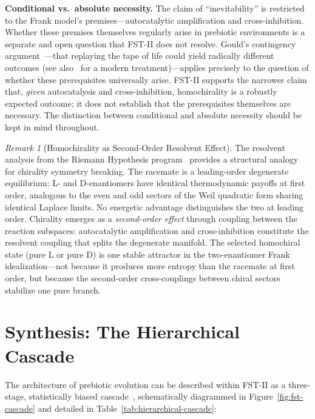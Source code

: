 \documentclass[12pt,a4paper]{article}
\theoremstyle{remark}
\newtheorem{remark}{Remark}
\begin{document}
\textbf{Conditional vs.\ absolute necessity.} The claim of ``inevitability'' is restricted to the Frank model's premises---autocatalytic amplification and cross-inhibition. Whether these premises themselves regularly arise in prebiotic environments is a separate and open question that FST-II does not resolve. Gould's contingency argument~\citep{Gould1989}---that replaying the tape of life could yield radically different outcomes (see also~\citet{UnbecomingBeing} for a modern treatment)---applies precisely to the question of whether these prerequisites universally arise. FST-II supports the narrower claim that, \emph{given} autocatalysis and cross-inhibition, homochirality is a robustly expected outcome; it does not establish that the prerequisites themselves are necessary. The distinction between conditional and absolute necessity should be kept in mind throughout.

\begin{remark}[Homochirality as Second-Order Resolvent Effect]
\label{rem:chirality-resolvent}
The resolvent analysis from the Riemann Hypothesis program~\citep{GeigerRH2026b} provides a structural analogy for chirality symmetry breaking. The racemate is a leading-order degenerate equilibrium: L- and D-enantiomers have identical thermodynamic payoffs at first order, analogous to the even and odd sectors of the Weil quadratic form sharing identical Laplace limits. No energetic advantage distinguishes the two at leading order. Chirality emerges as a \emph{second-order effect} through coupling between the reaction subspaces: autocatalytic amplification and cross-inhibition constitute the resolvent coupling that splits the degenerate manifold. The selected homochiral state (pure L or pure D) is one stable attractor in the two-enantiomer Frank idealization---not because it produces more entropy than the racemate at first order, but because the second-order cross-couplings between chiral sectors stabilize one pure branch.
\end{remark}

\section{Synthesis: The Hierarchical Cascade}
\label{sec:synthesis}

The architecture of prebiotic evolution can be described within FST-II as a three-stage, statistically biased cascade~\citep{ThermodynamicsLife}, schematically diagrammed in Figure~\ref{fig:fst-cascade} and detailed in Table~\ref{tab:hierarchical-cascade}:
\end{document}
